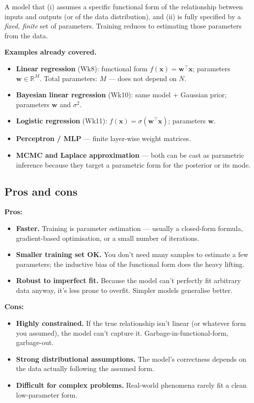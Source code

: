 \documentclass[11pt, a4paper]{article}
\begin{document}
\begin{defbox}
A model that (i) assumes a specific functional form of the relationship between inputs and outputs (or of the data distribution), and (ii) is fully specified by a \emph{fixed, finite} set of parameters. Training reduces to estimating those parameters from the data.
\end{defbox}

\textbf{Examples already covered.}
\begin{itemize}
  \item \textbf{Linear regression} (Wk8): functional form $f(\mathbf{x}) = \mathbf{w}^\top\mathbf{x}$; parameters $\mathbf{w}\in\mathbb{R}^M$. Total parameters: $M$ — does not depend on $N$.
  \item \textbf{Bayesian linear regression} (Wk10): same model + Gaussian prior; parameters $\mathbf{w}$ and $\sigma^2$.
  \item \textbf{Logistic regression} (Wk11): $f(\mathbf{x}) = \sigma(\mathbf{w}^\top\mathbf{x})$; parameters $\mathbf{w}$.
  \item \textbf{Perceptron / MLP} — finite layer-wise weight matrices.
  \item \textbf{MCMC and Laplace approximation} — both can be cast as parametric inference because they target a parametric form for the posterior or its mode.
\end{itemize}

\subsection{Pros and cons}

\textbf{Pros:}
\begin{itemize}
  \item \textbf{Faster.} Training is parameter estimation — usually a closed-form formula, gradient-based optimisation, or a small number of iterations.
  \item \textbf{Smaller training set OK.} You don't need many samples to estimate a few parameters; the inductive bias of the functional form does the heavy lifting.
  \item \textbf{Robust to imperfect fit.} Because the model can't perfectly fit arbitrary data anyway, it's less prone to overfit. Simpler models generalise better.
\end{itemize}

\textbf{Cons:}
\begin{itemize}
  \item \textbf{Highly constrained.} If the true relationship isn't linear (or whatever form you assumed), the model can't capture it. Garbage-in-functional-form, garbage-out.
  \item \textbf{Strong distributional assumptions.} The model's correctness depends on the data actually following the assumed form.
  \item \textbf{Difficult for complex problems.} Real-world phenomena rarely fit a clean low-parameter form.
\end{itemize}
\end{document}
